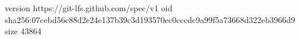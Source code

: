 version https://git-lfs.github.com/spec/v1
oid sha256:07cebd56c88d2e24e137b39c3d193570ec0cccdc9a99f5a73668d322eb3966d9
size 43864
